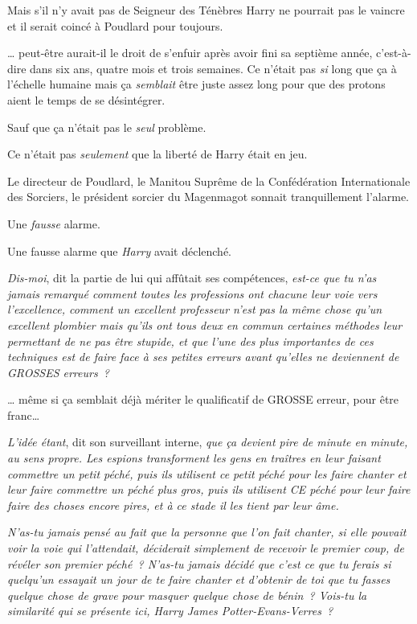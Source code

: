 Mais s'il n'y avait pas de Seigneur des Ténèbres Harry ne pourrait pas le vaincre et il serait coincé à Poudlard pour toujours.

… peut-être aurait-il le droit de s'enfuir après avoir fini sa septième année, c'est-à-dire dans six ans, quatre mois et trois semaines.
Ce n'était pas \emph{si} long que ça à l'échelle humaine mais ça \emph{semblait} être juste assez long pour que des protons aient le temps de se désintégrer.

Sauf que ça n'était pas le \emph{seul} problème.

Ce n'était pas \emph{seulement} que la liberté de Harry était en jeu.

Le directeur de Poudlard, le Manitou Suprême de la Confédération Internationale des Sorciers, le président sorcier du Magenmagot sonnait tranquillement l'alarme.

Une \emph{fausse} alarme.

Une fausse alarme que \emph{Harry} avait déclenché.

\emph{Dis-moi}, dit la partie de lui qui affûtait ses compétences, \emph{est-ce que tu n'as jamais remarqué comment toutes les professions ont chacune leur voie vers l'excellence, comment un excellent professeur n'est pas la même chose qu'un excellent plombier mais qu'ils ont tous deux en commun certaines méthodes leur permettant de ne pas être stupide, et que l'une des plus importantes de ces techniques est de faire face à ses petites erreurs avant qu'elles ne deviennent de GROSSES erreurs~?}

… même si ça semblait déjà mériter le qualificatif de GROSSE erreur, pour être franc…

\emph{L'idée étant}, dit son surveillant interne, \emph{que ça devient pire de minute en minute, au sens propre.
Les espions transforment les gens en traîtres en leur faisant commettre un petit péché, puis ils utilisent ce petit péché pour les faire chanter et leur faire commettre un péché plus gros, puis ils utilisent CE péché pour leur faire faire des choses encore pires, et à ce stade il les tient par leur âme.}

\emph{N'as-tu jamais pensé au fait que la personne que l'on fait chanter, si elle pouvait voir la voie qui l'attendait, déciderait simplement de recevoir le premier coup, de révéler son premier péché~?
N'as-tu jamais décidé que c'est ce que tu ferais si quelqu'un essayait un jour de te faire chanter et d'obtenir de toi que tu fasses quelque chose de grave pour masquer quelque chose de bénin~?
Vois-tu la similarité qui se présente ici, Harry James Potter-Evans-Verres~?}

